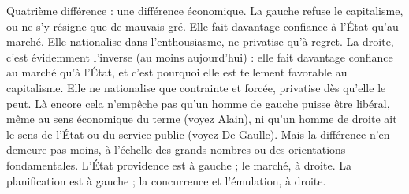 Quatrième différence : une différence économique. La gauche refuse le
capitalisme, ou ne s’y résigne que de mauvais gré. Elle fait davantage confiance
à l'État qu’au marché. Elle nationalise dans l'enthousiasme, ne privatise qu'à
regret. La droite, c’est évidemment l’inverse (au moins aujourd’hui) : elle fait
davantage confiance au marché qu’à l’État, et c’est pourquoi elle est tellement
favorable au capitalisme. Elle ne nationalise que contrainte et forcée, privatise
dès qu’elle le peut. Là encore cela n'empêche pas qu’un homme de gauche
puisse être libéral, même au sens économique du terme (voyez Alain), ni qu’un
homme de droite ait le sens de l’État ou du service public (voyez De Gaulle).
Mais la différence n’en demeure pas moins, à l’échelle des grands nombres ou
des orientations fondamentales. L'État providence est à gauche ; le marché, à
droite. La planification est à gauche ; la concurrence et l’émulation, à droite.

